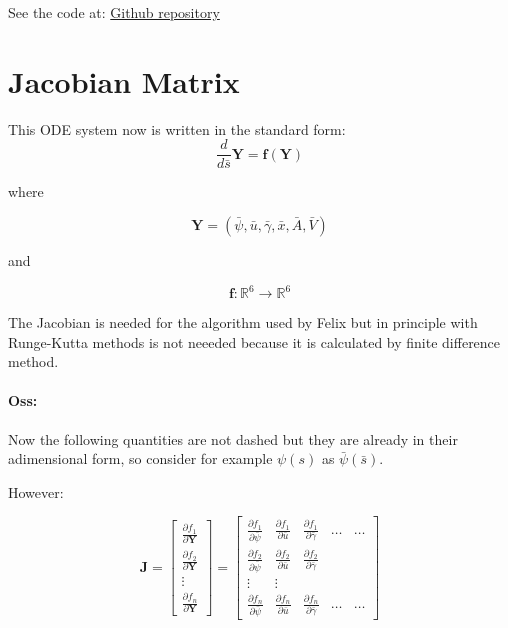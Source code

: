 \documentclass[12pt]{article}
\begin{document}
See the code at: \href{https://github.com/pietro-sillano/shapes/tree/main}{Github repository}




\appendix
\section{Jacobian Matrix}
This ODE system now is written in the standard form:
$$
\frac{d}{d\bar{s}} \mathbf{Y} = \mathbf{f} (\mathbf{Y})
$$

where 

$$
\mathbf{Y} = (\bar{\psi},\bar{u},\bar{\gamma},\bar{x},\bar{A},\bar{V})
$$

and 

$$
\mathbf{f}:\mathbb{R}^6 \to \mathbb{R}^6
$$


The Jacobian is needed for the algorithm used by Felix but in principle with Runge-Kutta methods is not neeeded because it is calculated by finite difference method.

\paragraph{Oss:} Now the following quantities are not dashed but they are already in their adimensional form, so consider for example $\psi(s)$ as $\bar{\psi}(\bar{s})$.

However:

$$
\mathbf{J} = \begin{bmatrix}
  \frac{\partial f_1}{\partial \mathbf{Y}} \\[1ex]
  \frac{\partial f_2}{\partial \mathbf{Y}} \\[1ex] 
  \vdots \\[1ex] 
  \frac{\partial f_n}{\partial \mathbf{Y}}
\end{bmatrix}=%
\begin{bmatrix}
    \frac{\partial f_1}{\partial \bar{\psi}} & 
      \frac{\partial f_1}{\partial \bar{u}} & 
      \frac{\partial f_1}{\partial \bar{\gamma}} & \dots & \dots \\[1ex] %
    \frac{\partial f_2}{\partial \bar{\psi}} & 
      \frac{\partial f_2}{\partial \bar{u}} & 
      \frac{\partial f_2}{\partial \bar{\gamma}} \\[1ex]

      \vdots & \vdots \\[1ex]
      \frac{\partial f_n}{\partial\bar{\psi}} & 
      \frac{\partial f_n}{\partial \bar{u}} & 
      \frac{\partial f_n}{\partial \bar{\gamma}}& \dots & \dots
  \end{bmatrix}
$$
\end{document}
